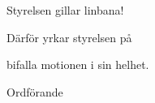 \documentclass[../_main/handlingar.tex]{subfiles}
\begin{document}
\motionssvar

Styrelsen gillar linbana!


Därför yrkar styrelsen på 

\begin{attsatser}
    \att bifalla motionen i sin helhet.
\end{attsatser}

\begin{signatures}{1}
    \ist
    \signature{Daniel Bakic}{Ordförande}
\end{signatures}
\end{document}
